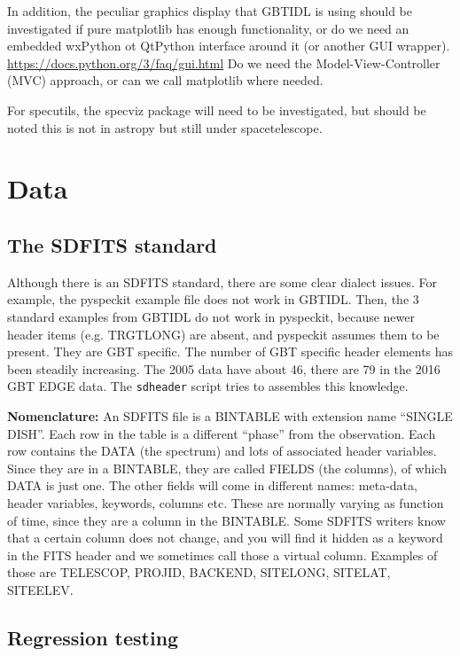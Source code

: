 \documentclass[12pt,a4paper]{article}
\begin{document}
In addition, the peculiar graphics display that GBTIDL is using should
be investigated if pure matplotlib has enough functionality, or do we
need an embedded wxPython ot QtPython interface around it (or another
GUI wrapper).  \url{https://docs.python.org/3/faq/gui.html}
Do we need the Model-View-Controller (MVC) approach, or can we call
matplotlib where needed.

For specutils, the specviz package will need to be investigated, but
should be noted this is not in astropy but still under
spacetelescope.


\section{Data}

\subsection{The SDFITS standard}

Although there is an SDFITS standard, there are some clear dialect
issues. For example, the pyspeckit example file does not work in
GBTIDL. Then, the 3 standard examples from GBTIDL do not work in
pyspeckit, because newer header items (e.g. TRGTLONG) are absent, and
pyspeckit assumes them to be present. They are GBT specific.  The
number of GBT specific header elements has been steadily
increasing. The 2005 data have about 46, there are 79 in the 2016 GBT
EDGE data. The {\tt sdheader} script tries to assembles this knowledge.


\bigskip\noindent

{\bf Nomenclature:} An SDFITS file is a BINTABLE with extension name
``SINGLE DISH''. Each row in the table is a different ``phase'' from
the observation. Each row contains the DATA (the spectrum) and lots of
associated header variables. Since they are in a BINTABLE, they are
called FIELDS (the columns), of which DATA is just one. The other fields
will come in different names: meta-data, header variables, keywords, columns etc.
These are normally varying as function of time, since they are a column in
the BINTABLE. Some SDFITS writers know that a certain column does not change,
and you will find it hidden as a keyword in the FITS header and we sometimes
call those a virtual column. Examples of those are TELESCOP, PROJID, BACKEND,
SITELONG, SITELAT, SITEELEV.

\subsection{Regression testing}
\end{document}
